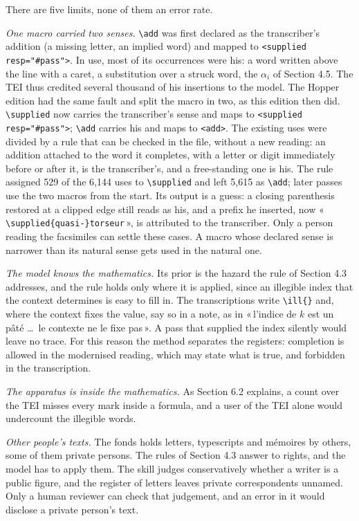 \documentclass[11pt]{article}
\newcommand{\q}[1]{«\,#1\,»}
\begin{document}
There are five limits, none of them an error rate.

\emph{One macro carried two senses.} \texttt{\textbackslash add} was first declared as the transcriber's addition (a missing letter, an implied word) and mapped to \texttt{<supplied resp="\#pass">}. In use, most of its occurrences were his: a word written above the line with a caret, a substitution over a struck word, the \(\alpha_i\) of Section 4.5. The TEI thus credited several thousand of his insertions to the model. The Hopper edition had the same fault and split the macro in two, as this edition then did. \texttt{\textbackslash supplied} now carries the transcriber's sense and maps to \texttt{<supplied resp="\#pass">}; \texttt{\textbackslash add} carries his and maps to \texttt{<add>}. The existing uses were divided by a rule that can be checked in the file, without a new reading: an addition attached to the word it completes, with a letter or digit immediately before or after it, is the transcriber's, and a free-standing one is his. The rule assigned 529 of the 6,144 uses to \texttt{\textbackslash supplied} and left 5,615 as \texttt{\textbackslash add}; later passes use the two macros from the start. Its output is a guess: a closing parenthesis restored at a clipped edge still reads as his, and a prefix he inserted, now \q{\texttt{\textbackslash supplied\{quasi-\}torseur}}, is attributed to the transcriber. Only a person reading the facsimiles can settle these cases. A macro whose declared sense is narrower than its natural sense gets used in the natural one.

\emph{The model knows the mathematics.} Its prior is the hazard the rule of Section 4.3 addresses, and the rule holds only where it is applied, since an illegible index that the context determines is easy to fill in. The transcriptions write \texttt{\textbackslash ill\{\}} and, where the context fixes the value, say so in a note, as in \q{l'indice de \(k\) est un pâté \ldots\ le contexte ne le fixe pas}. A pass that supplied the index silently would leave no trace. For this reason the method separates the registers: completion is allowed in the modernised reading, which may state what is true, and forbidden in the transcription.

\emph{The apparatus is inside the mathematics.} As Section 6.2 explains, a count over the TEI misses every mark inside a formula, and a user of the TEI alone would undercount the illegible words.

\emph{Other people's texts.} The fonds holds letters, typescripts and mémoires by others, some of them private persons. The rules of Section 4.3 answer to rights, and the model has to apply them. The skill judges conservatively whether a writer is a public figure, and the register of letters leaves private correspondents unnamed. Only a human reviewer can check that judgement, and an error in it would disclose a private person's text.
\end{document}
